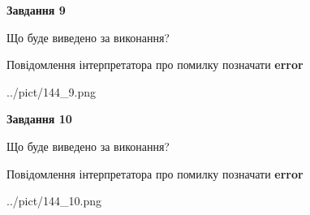 \documentclass[12pt, ukrainian]{article}
\begin{document}
{{\begin {center}\textbf{Завдання 9}\end {center}}\par
Що буде виведено за виконання? \par
Повідомлення інтерпретатора про помилку позначати \textbf{error}

\begin{center}
	{../pict/144_9.png}
\end{center}
\newpage

{\begin {center}\textbf{Завдання 10}\end {center}}\par
Що буде виведено за виконання? \par
Повідомлення інтерпретатора про помилку позначати \textbf{error}

\begin{center}
	{../pict/144_10.png}
\end{center}
\newpage

}
\end{document}
